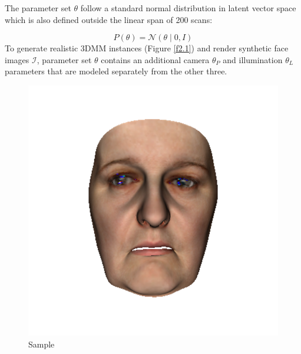 The parameter set $\theta$ follow a standard normal distribution in latent vector space\cite{EGGER2017115} which is also defined outside the linear span of 200 scans:

\begin{equation}
    P(\theta) = \mathcal{N}(\theta \mid 0, I)
\end{equation}
To generate realistic 3DMM instances (Figure \ref{f2.1}) and render synthetic face images $\mathcal{I}$, parameter set $\theta$ contains an additional camera $\theta_P$ and illumination $\theta_L$ parameters that are modeled separately from the other three. 

\begin{figure}
    \centering
    \captionsetup{labelformat=empty}
    \begin{minipage}{.32\textwidth}
        \centering
        \includegraphics[width=\textwidth]{Figures/Pictures/rs1_t.png}
        \caption*{Sample}
      \end{minipage}
    \begin{minipage}{.32\textwidth}
      \centering

\end{minipage}
\end{figure}
